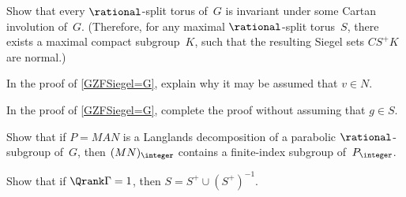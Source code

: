 \begin{exercises}

\item \label{CanChooseNormalSiegel}
Show that every $\rational$-split torus of~$G$ is invariant under some Cartan involution of~$G$. (Therefore, for any maximal $\rational$-split torus~$S$, there exists a maximal compact subgroup~$K$, such that the resulting Siegel sets $C S^+ K$ are normal.)

\item \label{SiegelvInN}
In the proof of \cref{GZFSiegel=G}, explain why it may be assumed that $v \in N$.

\item \label{SiegelgInS}
In the proof of \cref{GZFSiegel=G}, complete the proof without assuming that $g \in S$.

\item \label{MNZinPZ}
Show that if $P = MAN$ is a Langlands decomposition of a parabolic $\rational$-subgroup of~$G$, then $(MN)_{\integer}$ contains a finite-index subgroup of~$P_{\integer}$.

\item \label{S+orS-}
Show that if $\Qrank \Gamma = 1$, then $S = S^+ \cup (S^+)^{-1}$.


\end{exercises}
